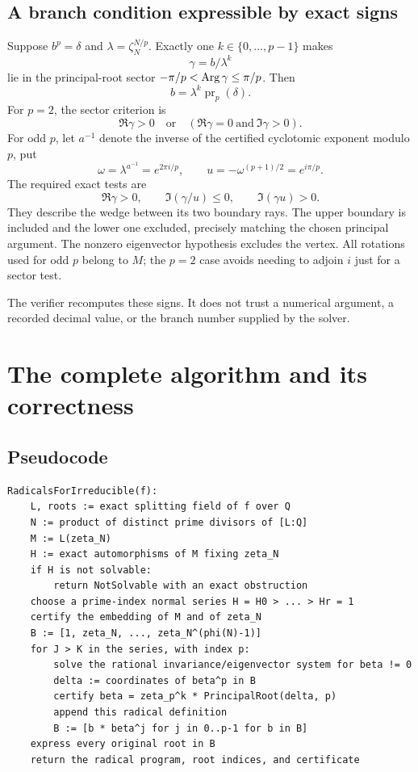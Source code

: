 \documentclass[11pt,letterpaper]{article}
\theoremstyle{definition}\newtheorem{definition}[theorem]{Definition}
\theoremstyle{remark}\newtheorem{remark}[theorem]{Remark}
\newcommand{\principal}[2]{\operatorname{pr}_{#1}(#2)}
\begin{document}
\subsection{A branch condition expressible by exact signs}
Suppose $b^p=\delta$ and $\lambda=\zeta_N^{N/p}$. Exactly one $k\in\{0,\ldots,p-1\}$ makes
\[
 \gamma=b/\lambda^k
\]
lie in the principal-root sector $-\pi/p<\operatorname{Arg}\gamma\leq\pi/p$. Then
\begin{equation}\label{eq:certbranch}
 b=\lambda^k\principal{p}{\delta}.
\end{equation}
For $p=2$, the sector criterion is
\[
 \Re\gamma>0\quad\text{or}\quad
 (\Re\gamma=0\ \text{and}\ \Im\gamma>0).
\]
For odd $p$, let $a^{-1}$ denote the inverse of the certified cyclotomic exponent modulo $p$, put
\[
 \omega=\lambda^{a^{-1}}=e^{2\pi i/p},\qquad
 u=-\omega^{(p+1)/2}=e^{i\pi/p}.
\]
The required exact tests are
\begin{equation}\label{eq:sector}
 \Re\gamma>0,\qquad
 \Im(\gamma/u)\leq0,\qquad
 \Im(\gamma u)>0.
\end{equation}
They describe the wedge between its two boundary rays. The upper boundary is included and the lower one excluded, precisely matching the chosen principal argument. The nonzero eigenvector hypothesis excludes the vertex. All rotations used for odd $p$ belong to $M$; the $p=2$ case avoids needing to adjoin $i$ just for a sector test.

The verifier recomputes these signs. It does not trust a numerical argument, a recorded decimal value, or the branch number supplied by the solver.

\section{The complete algorithm and its correctness}
\subsection{Pseudocode}
\begin{lstlisting}
RadicalsForIrreducible(f):
    L, roots := exact splitting field of f over Q
    N := product of distinct prime divisors of [L:Q]
    M := L(zeta_N)
    H := exact automorphisms of M fixing zeta_N
    if H is not solvable:
        return NotSolvable with an exact obstruction
    choose a prime-index normal series H = H0 > ... > Hr = 1
    certify the embedding of M and of zeta_N
    B := [1, zeta_N, ..., zeta_N^(phi(N)-1)]
    for J > K in the series, with index p:
        solve the rational invariance/eigenvector system for beta != 0
        delta := coordinates of beta^p in B
        certify beta = zeta_p^k * PrincipalRoot(delta, p)
        append this radical definition
        B := [b * beta^j for j in 0..p-1 for b in B]
    express every original root in B
    return the radical program, root indices, and certificate
\end{lstlisting}
\end{document}
